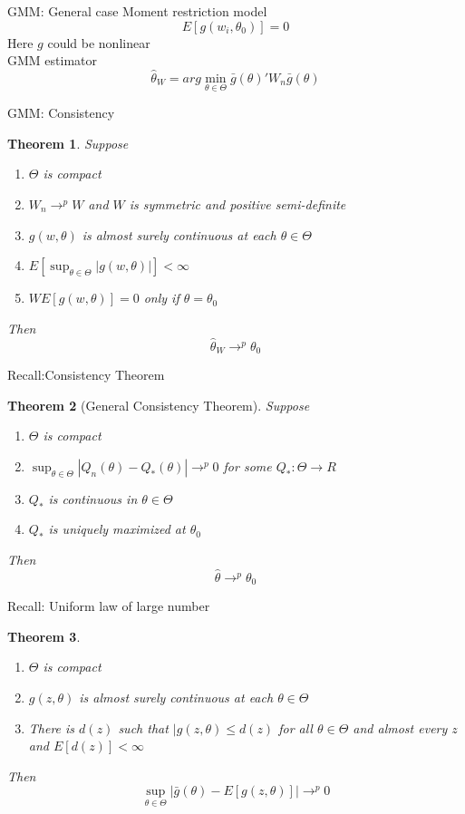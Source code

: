 \documentclass{beamer}
\newtheorem{thm}{Theorem}[subsection]
\begin{document}
\begin{frame}{GMM: General case}
	Moment restriction model
	\[E[g(w_i,\theta_0)] = 0\]
	Here $g$ could be nonlinear \\
	GMM estimator
	\[\hat{\theta}_W = arg \min_{\theta \in \Theta} \bar{g}(\theta)' W_n \bar{g}(\theta)\]
\end{frame}
\begin{frame}{GMM: Consistency}
	\begin{thm}
		Suppose
		\begin{enumerate}
		\item $\Theta$ is compact
		\item $W_n \rightarrow^p W$ and $W$ is symmetric and positive semi-definite
		\item $g(w,\theta)$ is almost surely continuous at each $\theta \in \Theta$
		\item $E[\sup_{\theta \in \Theta} |g(w,\theta)|] < \infty$
		\item $WE[g(w,\theta)] = 0$ only if $\theta = \theta_0$
		\end{enumerate}
		Then
		\[\hat{\theta}_W \rightarrow^p \theta_0\]
	\end{thm}
\end{frame}
\begin{frame}{Recall:Consistency Theorem}
	\begin{thm}[General Consistency Theorem]
		Suppose
		\begin{enumerate}
				\item $\Theta$ is compact
				\item $\sup_{\theta \in \Theta} |Q_n(\theta) - Q_{*} (\theta)| \rightarrow^p 0$ for some $Q_*:\Theta \rightarrow R$
				\item $Q_*$ is continuous in $\theta \in \Theta$
				\item $Q_*$ is uniquely maximized at $\theta_0$
		\end{enumerate}
		Then 
		\[\hat{\theta} \rightarrow^p \theta_0\]
	\end{thm}
\end{frame}
\begin{frame}{Recall: Uniform law of large number}
	\begin{thm}
		\begin{enumerate}
				\item $\Theta$ is compact
				\item $g(z,\theta)$ is almost surely continuous at each $\theta \in \Theta$
				\item There is $d(z)$ such that $|g(z,\theta) \leq d(z)$ for all $\theta \in \Theta$ and almost every $z$ and $E[d(z)] < \infty$
		\end{enumerate}
		Then 
		\[\sup_{\theta \in \Theta} |\bar{g}(\theta) - E[g(z,\theta)]| \rightarrow^p 0\]
	\end{thm}
\end{frame}
\end{document}
